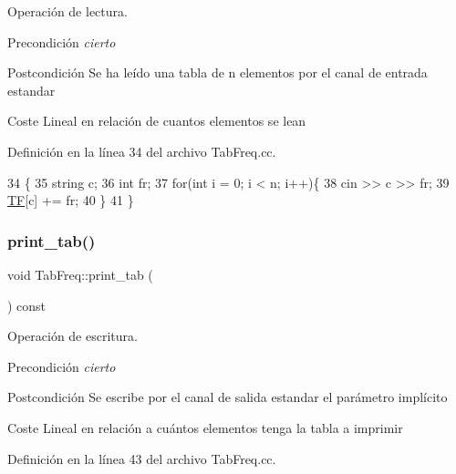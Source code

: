 Operación de lectura. 

\begin{DoxyPrecond}{Precondición}
{\itshape cierto} 
\end{DoxyPrecond}
\begin{DoxyPostcond}{Postcondición}
Se ha leído una tabla de n elementos por el canal de entrada estandar 
\end{DoxyPostcond}
\begin{DoxyParagraph}{Coste}
Lineal en relación de cuantos elementos se lean 
\end{DoxyParagraph}


Definición en la línea 34 del archivo Tab\+Freq.\+cc.


\begin{DoxyCode}
34                            \{
35     \textcolor{keywordtype}{string} c;
36     \textcolor{keywordtype}{int} fr;
37     \textcolor{keywordflow}{for}(\textcolor{keywordtype}{int} i = 0; i < n; i++)\{
38       cin >> c >> fr;
39       \hyperlink{class_tab_freq_ae6be9a9671af1d897960648e10a62cfb}{TF}[c] += fr;
40     \}
41 \}
\end{DoxyCode}
\mbox{\label{class_tab_freq_a20d75c460199ab8ef3e189d9ad81c05b}} 
\subsubsection{\texorpdfstring{print\+\_\+tab()}{print\_tab()}}
{\footnotesize\ttfamily void Tab\+Freq\+::print\+\_\+tab (\begin{DoxyParamCaption}{ }\end{DoxyParamCaption}) const}



Operación de escritura. 

\begin{DoxyPrecond}{Precondición}
{\itshape cierto} 
\end{DoxyPrecond}
\begin{DoxyPostcond}{Postcondición}
Se escribe por el canal de salida estandar el parámetro implícito 
\end{DoxyPostcond}
\begin{DoxyParagraph}{Coste}
Lineal en relación a cuántos elementos tenga la tabla a imprimir 
\end{DoxyParagraph}


Definición en la línea 43 del archivo Tab\+Freq.\+cc.


